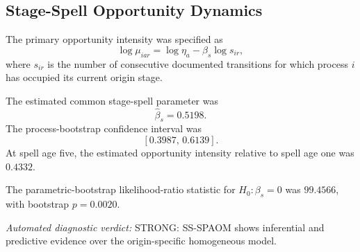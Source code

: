 \subsection{Stage-Spell Opportunity Dynamics}

The primary opportunity intensity was specified as
\[
\log \mu_{iar}=\log\eta_a-\beta_s\log s_{ir},
\]
where \(s_{ir}\) is the number of consecutive documented transitions for which process \(i\) has occupied its current origin stage.

The estimated common stage-spell parameter was
\[
\widehat{\beta}_s=0.5198.
\]
The process-bootstrap confidence interval was
\[
\left[0.3987,\,0.6139\right].
\]
At spell age five, the estimated opportunity intensity relative to spell age one was \(0.4332\).

The parametric-bootstrap likelihood-ratio statistic for \(H_0:\beta_s=0\) was \(99.4566\), with bootstrap \(p=0.0020\).

\textit{Automated diagnostic verdict:} STRONG: SS-SPAOM shows inferential and predictive evidence over the origin-specific homogeneous model.
